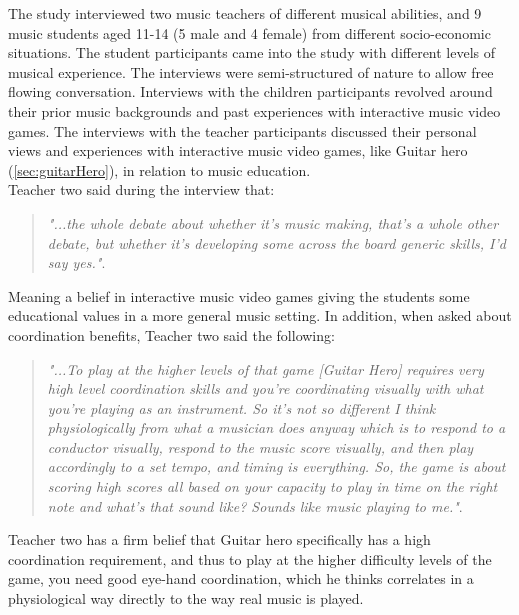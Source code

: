 The study interviewed two music teachers of different musical abilities, and 9 music students aged 11-14 (5 male and 4 female) from different socio-economic situations. The student participants came into the study with different levels of musical experience. The interviews were semi-structured of nature to allow free flowing conversation. Interviews with the children participants revolved around their prior music backgrounds and past experiences with interactive music video games. The interviews with the teacher participants discussed their personal views and experiences with interactive music video games, like Guitar hero (\autoref{sec:guitarHero}), in relation to music education.\\

Teacher two said during the interview that:
\begin{quote}
	\textit{"...the whole debate about whether it’s music making, that’s a whole other debate, but whether it’s developing some across the board generic skills, I’d say yes."}\cite[p.~98]{interactiveMusicVideoGames}.\\
\end{quote}
Meaning a belief in interactive music video games giving the students some educational values in a more general music setting. In addition, when asked about coordination benefits, Teacher two said the following:
\begin{quote}
	\textit{"...To play at the higher levels of that game [Guitar Hero] requires very high level coordination skills and you’re coordinating visually with what you’re playing as an instrument. So it’s not so different I think physiologically from what a musician does anyway which is to respond to a conductor visually, respond to the music score visually, and then play accordingly to a set tempo, and timing is everything. So, the game is about scoring high scores all based on your capacity to play in time on the right note and what’s that sound like? Sounds like music playing to me."}\cite[p.~98]{interactiveMusicVideoGames}.\\
\end{quote}
Teacher two has a firm belief that Guitar hero specifically has a high coordination requirement, and thus to play at the higher difficulty levels of the game, you need good eye-hand coordination, which he thinks correlates in a physiological way directly to the way real music is played.\\

